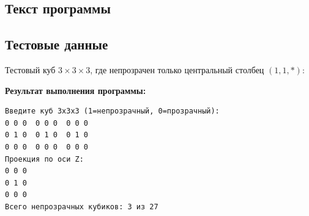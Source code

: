 \subsection{Текст программы}



\subsection{Тестовые данные}

Тестовый куб $3\times3\times3$, где непрозрачен только центральный
столбец $(1,1,*)$:

\textbf{Результат выполнения программы:}
\begin{lstlisting}[language={},basicstyle=\ttfamily\small,frame=single]
Введите куб 3x3x3 (1=непрозрачный, 0=прозрачный):
0 0 0  0 0 0  0 0 0
0 1 0  0 1 0  0 1 0
0 0 0  0 0 0  0 0 0
Проекция по оси Z:
0 0 0
0 1 0
0 0 0
Всего непрозрачных кубиков: 3 из 27
\end{lstlisting}
